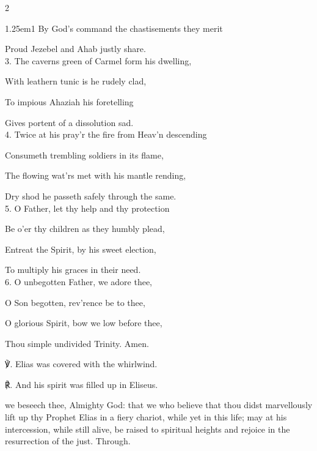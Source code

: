 \begin{paracol}{2}
\begin{hangparas}{1.25em}{1}
By God's command the chastisements they merit

Proud Jezebel and Ahab justly share.\\

3. The caverns green of Carmel form his dwelling,

With leathern tunic is he rudely clad,

To impious Ahaziah his foretelling

Gives portent of a dissolution sad.\\

4. Twice at his pray'r the fire from Heav'n descending

Consumeth trembling soldiers in its flame,

The flowing wat'rs met with his mantle rending,

Dry shod he passeth safely through the same.\\

5. O Father, let thy help and thy protection

Be o'er thy children as they humbly plead,

Entreat the Spirit, by his sweet election,

To multiply his graces in their need.\\

6. O unbegotten Father, we adore thee,

O Son begotten, rev'rence be to thee,

O glorious Spirit, bow we low before thee,

Thou simple undivided Trinity. Amen.\\
\end{hangparas}

    ℣. Elias was covered with the whirlwind.

	℟. And his spirit was filled up in Eliseus.

\par\noindent

\fussy	
\end{paracol}


\collect
{} we beseech thee, Almighty God: that we who believe that thou didst marvellously lift up thy Prophet Elias in a fiery chariot, while yet in this life; may at his intercession, while still alive, be raised to spiritual heights and rejoice in the resurrection of the just. Through.

